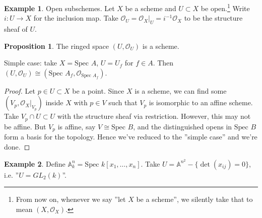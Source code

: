 \documentclass{article}
\theoremstyle{definition}
\newtheorem{prop}[theorem]{Proposition}
\newtheorem{example}{Example}[section]
\begin{document}
\begin{example}
    Open subschemes. Let $X$ be a scheme and $U \subset X$ be open.\footnote{From now on, whenever we say ''let $X$ be a scheme'', we silently take that to mean $(X, \mathcal{O}_X)$.} Write $i : U \to X$ for the inclusion map. Take $\mathcal{O}_U = \mathcal{O}_X |_U = i^{-1} \mathcal{O}_X$ to be the structure sheaf of $U$.
\end{example}
\begin{prop}
    The ringed space $(U, \mathcal{O}_U)$ is a scheme.
\end{prop}
Simple case: take $X = \text{Spec }A$, $U = U_f$ for $f \in A$. Then $(U, \mathcal{O}_U) \cong (\text{Spec }A_f, \mathcal{O}_{\text{Spec }A_f})$.
\begin{proof}
    Let $p \in U \subset X$ be a point. Since $X$ is a scheme, we can find some $(V_p, \mathcal{O}_X |_{V_p})$ inside $X$ with $p \in V$ such that $V_p$ is isomorphic to an affine scheme. Take $V_p \cap U \subset U$ with the structure sheaf via restriction. However, this may not be affine. But $V_p$ is affine, say $V \cong \text{Spec }B$, and the distinguished opens in $\text{Spec }B$ form a basis for the topology. Hence we've reduced to the ''simple case'' and we're done.
\end{proof}
\begin{example}
    Define $\mathbb{A}_k^n = \text{Spec }k[x_1,\ldots,x_n]$. Take $U = \mathbb{A}^{n^2} - \{\det(x_{ij}) = 0\}$, i.e. ''$U = GL_2(k)$''.
\end{example}
\end{document}
